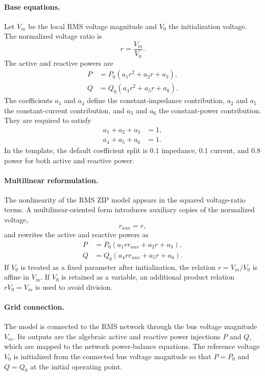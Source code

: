\paragraph{Base equations.}
Let $V_m$ be the local RMS voltage magnitude and $V_0$ the initialization voltage. The normalized voltage ratio is
\begin{equation}
    r = \frac{V_m}{V_0}.
\end{equation}
The active and reactive powers are
\begin{align}
    P &= P_0\left(a_1 r^2+a_2 r+a_3\right), \\
    Q &= Q_0\left(a_4 r^2+a_5 r+a_6\right).
\end{align}
The coefficients $a_1$ and $a_4$ define the constant-impedance contribution, $a_2$ and $a_5$ the constant-current contribution, and $a_3$ and $a_6$ the constant-power contribution. They are required to satisfy
\begin{align}
    a_1+a_2+a_3 &= 1, \\
    a_4+a_5+a_6 &= 1.
\end{align}
In the template, the default coefficient split is $0.1$ impedance, $0.1$ current, and $0.8$ power for both active and reactive power.

\paragraph{Multilinear reformulation.}
The nonlinearity of the RMS ZIP model appears in the squared voltage-ratio terms. A multilinear-oriented form introduces auxiliary copies of the normalized voltage,
\begin{equation}
    r_{aux}=r,
\end{equation}
and rewrites the active and reactive powers as
\begin{align}
    P &= P_0\left(a_1 r r_{aux}+a_2 r+a_3\right), \\
    Q &= Q_0\left(a_4 r r_{aux}+a_5 r+a_6\right).
\end{align}
If $V_0$ is treated as a fixed parameter after initialization, the relation $r=V_m/V_0$ is affine in $V_m$. If $V_0$ is retained as a variable, an additional product relation $rV_0=V_m$ is used to avoid division.

\paragraph{Grid connection.}
The model is connected to the RMS network through the bus voltage magnitude $V_m$. Its outputs are the algebraic active and reactive power injections $P$ and $Q$, which are mapped to the network power-balance equations. The reference voltage $V_0$ is initialized from the connected bus voltage magnitude so that $P=P_0$ and $Q=Q_0$ at the initial operating point.

